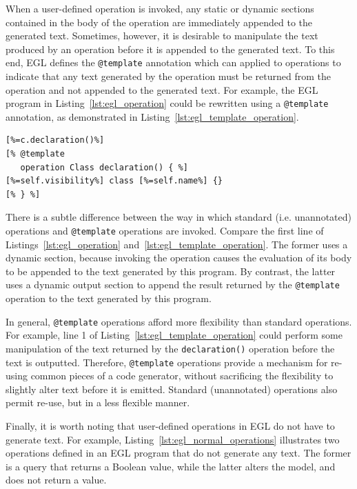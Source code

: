 When a user-defined operation is invoked, any static or dynamic sections contained in the body of the operation are immediately appended to the generated text. Sometimes, however, it is desirable to manipulate the text produced by an operation before it is appended to the generated text. To this end, EGL defines the \texttt{@template} annotation which can applied to operations to indicate that any text generated by the operation must be returned from the operation and not appended to the generated text. For example, the EGL program in Listing~\ref{lst:egl_operation} could be rewritten using a \texttt{@template} annotation, as demonstrated in Listing~\ref{lst:egl_template_operation}.

\begin{lstlisting}[float=h, caption=Using a template operation to specify the text generated for a declaration of a Java class., label=lst:egl_template_operation, language=EGL]
[%=c.declaration()%]
[% @template
   operation Class declaration() { %]
[%=self.visibility%] class [%=self.name%] {}
[% } %]
\end{lstlisting}

There is a subtle difference between the way in which standard (i.e. unannotated) operations and \texttt{@template} operations are invoked. Compare the first line of Listings~\ref{lst:egl_operation} and~\ref{lst:egl_template_operation}. The former uses a dynamic section, because invoking the operation causes the evaluation of its body to be appended to the text generated by this program. By contrast, the latter uses a dynamic output section to append the result returned by the \texttt{@template} operation to the text generated by this program.

In general, \texttt{@template} operations afford more flexibility than standard operations. For example, line 1 of Listing~\ref{lst:egl_template_operation} could perform some manipulation of the text returned by the \texttt{declaration()} operation before the text is outputted. Therefore, \texttt{@template} operations provide a mechanism for re-using common pieces of a code generator, without sacrificing the flexibility to slightly alter text before it is emitted. Standard (unannotated) operations also permit re-use, but in a less flexible manner.

Finally, it is worth noting that user-defined operations in EGL do not have to generate text. For example, Listing~\ref{lst:egl_normal_operations} illustrates two operations defined in an EGL program that do not generate any text. The former is a query that returns a Boolean value, while the latter alters the model, and does not return a value.

